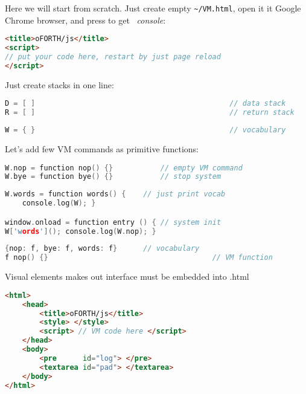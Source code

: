 \clearpage{}\label{jsvm}\secdown

Here we will start from scratch. Just create empty \verb|~/VM.html|, open it it
Google Chrome browser, and press  to get \js\ \emph{console}:
\begin{lstlisting}[language=html]
<title>oFORTH/js</title>
<script>
// put your code here, restart by just page reload
</script>
\end{lstlisting}

\noindent
Just create stacks in one line:

\begin{lstlisting}[language=c++]
D = [ ]												// data stack
R = [ ]												// return stack
\end{lstlisting}

\clearpage
\begin{lstlisting}[language=c++]
W = { }												// vocabulary
\end{lstlisting}

\noindent
Let's add few VM commands as primitive functions:

\begin{lstlisting}[language=c++]
W.nop = function nop() {}			// empty VM command
W.bye = function bye() {}			// stop system
\end{lstlisting}

\begin{lstlisting}[language=c++]
W.words = function words() {	// just print vocab
	console.log(W); }

window.onload = function entry () {	// system init
W['words'](); console.log(W.nop); }
\end{lstlisting}

\begin{lstlisting}[language=c++]
{nop: f, bye: f, words: f}		// vocabulary
f nop() {}										// VM function
\end{lstlisting}

\pg Visual elements makes out interface must be embedded into .html 

\begin{lstlisting}[language=html]
<html>
	<head>
		<title>oFORTH/js</title>
		<style> </style>
		<script> // VM code here </script>
	</head>
	<body>
		<pre      id="log"> </pre>
		<textarea id="pad"> </textarea>
	</body>
</html>
\end{lstlisting}

